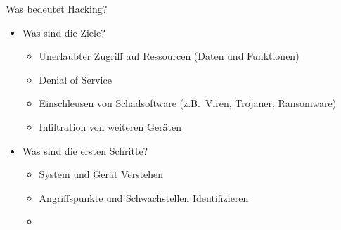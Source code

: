\documentclass[11pt, aspectratio=169, modernfonts]{beamer}
\begin{document}
  \begin{frame}{Was bedeutet Hacking?}
    \begin{itemize}
      \item Was sind die Ziele?
      \begin{itemize}
        \item Unerlaubter Zugriff auf Ressourcen (Daten und Funktionen)
        \item Denial of Service
        \item Einschleusen von Schadsoftware (z.B.~Viren, Trojaner, Ransomware)
        \item Infiltration von weiteren Geräten
      \end{itemize}
      \item Was sind die ersten Schritte?
      \begin{itemize}
        \item System und Gerät Verstehen
        \item Angriffspunkte und Schwachstellen Identifizieren
        \item
      \end{itemize}
    \end{itemize}
  \end{frame}



\end{document}

